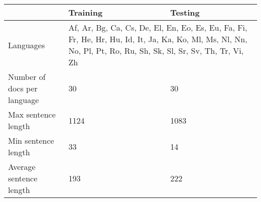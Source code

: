 \begin{tabular}{p{}p{}p{}} 
\hline \hline

 & Training & Testing \\

\hline
Languages 	& \multicolumn{2}{p{.6\textwidth}}{Af, Ar, Bg, Ca, Cs, De, El, En, Eo, Es, Eu, Fa, Fi, Fr, He, Hr, Hu, Id, It, Ja, Ka, Ko, Ml, Ms, Nl, Nn, No, Pl, Pt, Ro, Ru, Sh, Sk, Sl, Sr, Sv, Th, Tr, Vi, Zh} \\
Number of docs per language & 30 & 30 \\
Max sentence length & 1124 & 1083 \\
Min sentence length & 33 & 14 \\
Average sentence length & 193  & 222 \\

\hline \hline
\end{tabular}
